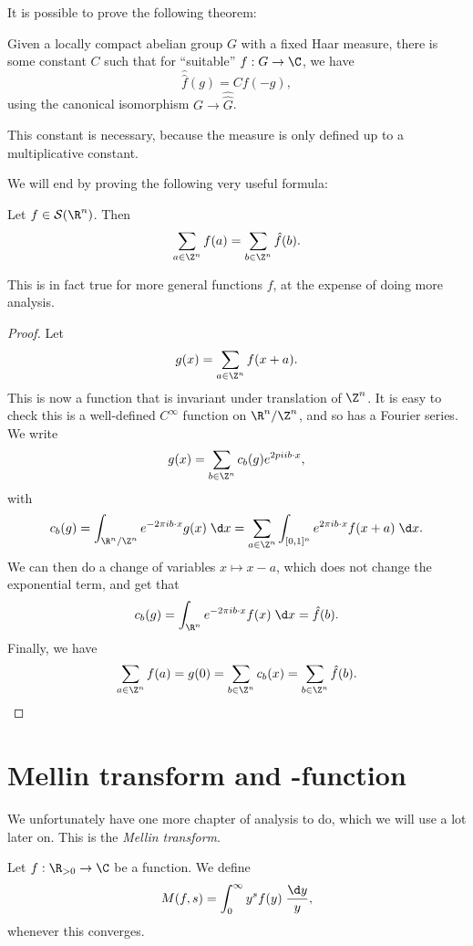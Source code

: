 \documentclass[a4paper]{article}
\begin{document}
It is possible to prove the following theorem:
\begin{thm}
 Given a locally compact abelian group $G$ with a fixed Haar measure, there is some constant $C$ such that for ``suitable'' $f: G \to \C$, we have
 \[
   \hat{\hat{f}}(g) = C f(-g),
 \]
 using the canonical isomorphism $G \to \hat{\hat{G}}$.
\end{thm}
This constant is necessary, because the measure is only defined up to a multiplicative constant.

We will end by proving the following very useful formula:
\begin{thm}
  Let $f \in \mathcal{S}(\R^n)$. Then
  \[
    \sum_{a \in \Z^n} f(a) = \sum_{b \in \Z^n} \hat{f}(b).
  \]
\end{thm}
This is in fact true for more general functions $f$, at the expense of doing more analysis.

\begin{proof}
  Let
  \[
    g(x) = \sum_{a \in \Z^n} f(x + a).
  \]
  This is now a function that is invariant under translation of $\Z^n$. It is easy to check this is a well-defined $C^\infty$ function on $\R^n/\Z^n$, and so has a Fourier series. We write
  \[
    g(x) = \sum_{b \in \Z^n} c_b(g) e^{2pi i b \cdot x},
  \]
  with
  \[
    c_b(g) = \int_{\R^n/\Z^n} e^{-2\pi i b\cdot x} g(x) \;\d x = \sum_{a \in \Z^n} \int_{[0, 1]^n} e^{2\pi i b\cdot x} f(x + a) \;\d x.
  \]
  We can then do a change of variables $x \mapsto x - a$, which does not change the exponential term, and get that
  \[
    c_b(g) = \int_{\R^n} e^{-2\pi i b \cdot x} f(x) \;\d x = \hat{f}(b).
  \]
  Finally, we have
  \[
    \sum_{a \in \Z^n} f(a) = g(0) = \sum_{b \in \Z^n} c_b(x) = \sum_{b \in \Z^n} \hat{f}(b).
  \]
\end{proof}

\section{Mellin transform and -function}
We unfortunately have one more chapter of analysis to do, which we will use a lot later on. This is the \emph{Mellin transform}.

\begin{defi}
  Let $f: \R_{>0} \to\C$ be a function. We define
  \[
    M(f, s) = \int_0^\infty y^s f(y) \;\frac{\d y}{y},
  \]
  whenever this converges.
\end{defi}
\end{document}
